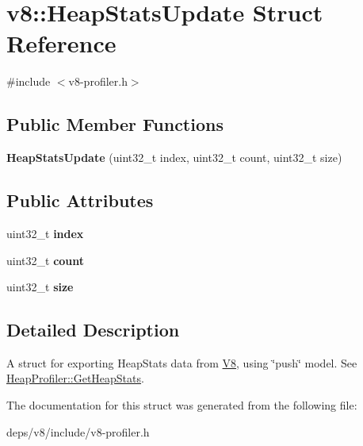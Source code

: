 \hypertarget{structv8_1_1_heap_stats_update}{}\section{v8\+:\+:Heap\+Stats\+Update Struct Reference}
\label{structv8_1_1_heap_stats_update}


{\ttfamily \#include $<$v8-\/profiler.\+h$>$}

\subsection*{Public Member Functions}
\begin{DoxyCompactItemize}
\item 
\hypertarget{structv8_1_1_heap_stats_update_aba606181fa7071647cc91a558c450cf3}{}{\bfseries Heap\+Stats\+Update} (uint32\+\_\+t index, uint32\+\_\+t count, uint32\+\_\+t size)\label{structv8_1_1_heap_stats_update_aba606181fa7071647cc91a558c450cf3}

\end{DoxyCompactItemize}
\subsection*{Public Attributes}
\begin{DoxyCompactItemize}
\item 
\hypertarget{structv8_1_1_heap_stats_update_a90f427acc6e9b8cf2001ca09541545d7}{}uint32\+\_\+t {\bfseries index}\label{structv8_1_1_heap_stats_update_a90f427acc6e9b8cf2001ca09541545d7}

\item 
\hypertarget{structv8_1_1_heap_stats_update_aa74badb1bd196e538b45b971350c33de}{}uint32\+\_\+t {\bfseries count}\label{structv8_1_1_heap_stats_update_aa74badb1bd196e538b45b971350c33de}

\item 
\hypertarget{structv8_1_1_heap_stats_update_a842a199bd372f411f0ae5816e38c45e2}{}uint32\+\_\+t {\bfseries size}\label{structv8_1_1_heap_stats_update_a842a199bd372f411f0ae5816e38c45e2}

\end{DoxyCompactItemize}


\subsection{Detailed Description}
A struct for exporting Heap\+Stats data from \hyperlink{classv8_1_1_v8}{V8}, using \char`\"{}push\char`\"{} model. See \hyperlink{classv8_1_1_heap_profiler_a87a69789d8dc75faa97011150ad17c8e}{Heap\+Profiler\+::\+Get\+Heap\+Stats}. 

The documentation for this struct was generated from the following file\+:\begin{DoxyCompactItemize}
\item 
deps/v8/include/v8-\/profiler.\+h\end{DoxyCompactItemize}
